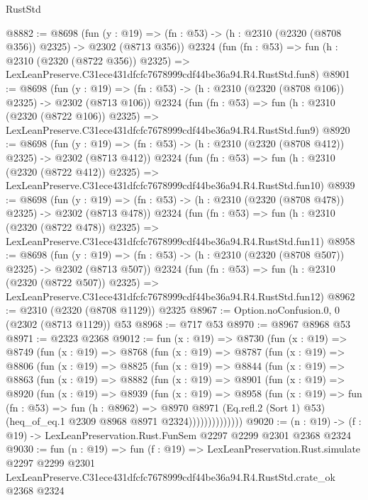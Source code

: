 \begin{lexlean}{RustStd}
\begin{coremodule}
@8882 := @8698
    (fun (y : @19) => (fn : @53) -> (h : @2310 (@2320 (@8708 @356)) @2325) -> @2302 (@8713 @356))
    @2324
    (fun (fn : @53) =>
    fun (h : @2310 (@2320 (@8722 @356)) @2325) =>
    LexLeanPreserve.C31ece431dfcfc7678999cdf44be36a94.R4.RustStd.fun8)
@8901 := @8698
    (fun (y : @19) => (fn : @53) -> (h : @2310 (@2320 (@8708 @106)) @2325) -> @2302 (@8713 @106))
    @2324
    (fun (fn : @53) =>
    fun (h : @2310 (@2320 (@8722 @106)) @2325) =>
    LexLeanPreserve.C31ece431dfcfc7678999cdf44be36a94.R4.RustStd.fun9)
@8920 := @8698
    (fun (y : @19) => (fn : @53) -> (h : @2310 (@2320 (@8708 @412)) @2325) -> @2302 (@8713 @412))
    @2324
    (fun (fn : @53) =>
    fun (h : @2310 (@2320 (@8722 @412)) @2325) =>
    LexLeanPreserve.C31ece431dfcfc7678999cdf44be36a94.R4.RustStd.fun10)
@8939 := @8698
    (fun (y : @19) => (fn : @53) -> (h : @2310 (@2320 (@8708 @478)) @2325) -> @2302 (@8713 @478))
    @2324
    (fun (fn : @53) =>
    fun (h : @2310 (@2320 (@8722 @478)) @2325) =>
    LexLeanPreserve.C31ece431dfcfc7678999cdf44be36a94.R4.RustStd.fun11)
@8958 := @8698
    (fun (y : @19) => (fn : @53) -> (h : @2310 (@2320 (@8708 @507)) @2325) -> @2302 (@8713 @507))
    @2324
    (fun (fn : @53) =>
    fun (h : @2310 (@2320 (@8722 @507)) @2325) =>
    LexLeanPreserve.C31ece431dfcfc7678999cdf44be36a94.R4.RustStd.fun12)
@8962 := @2310 (@2320 (@8708 @1129)) @2325
@8967 := Option.noConfusion.{0, 0} (@2302 (@8713 @1129)) @53
@8968 := @717 @53
@8970 := @8967 @8968 @53
@8971 := @2323 @2368
@9012 := fun (x : @19) =>
  @8730
    (fun (x : @19) =>
    @8749
      (fun (x : @19) =>
      @8768
        (fun (x : @19) =>
        @8787
          (fun (x : @19) =>
          @8806
            (fun (x : @19) =>
            @8825
              (fun (x : @19) =>
              @8844
                (fun (x : @19) =>
                @8863
                  (fun (x : @19) =>
                  @8882
                    (fun (x : @19) =>
                    @8901
                      (fun (x : @19) =>
                      @8920
                        (fun (x : @19) =>
                        @8939
                          (fun (x : @19) =>
                          @8958
                            (fun (x : @19) =>
                            fun (fn : @53) =>
                            fun (h : @8962) =>
                            @8970
                              @8971
                              (Eq.refl.{2} (Sort 1) @53)
                              (heq_of_eq.{1} @2309 @8968 @8971 @2324))))))))))))))
@9020 := (n : @19) -> (f : @19) -> LexLeanPreservation.Rust.FunSem @2297 @2299 @2301 @2368 @2324
@9030 := fun (n : @19) =>
  fun (f : @19) =>
  LexLeanPreservation.Rust.simulate
    @2297
    @2299
    @2301
    LexLeanPreserve.C31ece431dfcfc7678999cdf44be36a94.R4.RustStd.crate_ok
    @2368
    @2324
\end{coremodule}
\end{lexlean}
